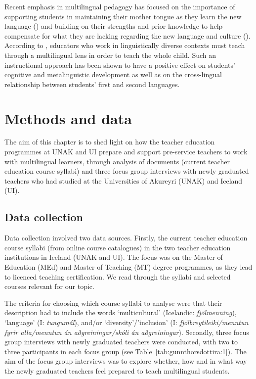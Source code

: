 \documentclass[output=paper]{langscibook}
\begin{document}
Recent emphasis in multilingual pedagogy has focused on the importance of supporting students in maintaining their mother tongue as they learn the new language (\citealt{BaileyMarsden2017}) and building on their strengths and prior knowledge to help compensate for what they are lacking regarding the new language and culture (\citealt{Cummins2014}). According to \citet{Cummins2017}, educators who work in linguistically diverse contexts must teach through a multilingual lens in order to teach the whole child. Such an instructional approach has been shown to have a positive effect on students’ cognitive and metalinguistic development as well as on the cross-lingual relationship between students’ first and second languages.

\section{Methods and data} %

The aim of this chapter is to shed light on how the teacher education programmes at UNAK and UI prepare and support pre-service teachers to work with multilingual learners, through analysis of documents (current teacher education course syllabi) and three focus group interviews with newly graduated teachers who had studied at the Universities of Akureyri (UNAK) and Iceland (UI). 

\subsection{Data collection}

Data collection involved two data sources. Firstly, the current teacher education course syllabi (from online course catalogues) in the two  teacher education institutions in Iceland (UNAK and UI). The focus was on the Master of Education (MEd) and Master of Teaching (MT) degree programmes, as they lead to licenced teaching certification. We read through the syllabi and selected courses relevant for our topic.

The criteria for choosing which course syllabi to analyse were that their description had to include the words ‘multicultural’ (Icelandic: \textit{fjölmenning}), ‘language’ (I: \textit{tungumál}), and/or ‘diversity’/’inclusion’ (I: \textit{fjölbreytileiki\slash menntun fyrir alla\slash menntun án aðgreiningar\slash skóli án aðgreiningar}). Secondly, three focus group interviews with newly graduated teachers were conducted, with two to three participants in each focus group (see Table~\ref{tab:gunnthorsdottira:1}). The aim of the focus group interviews was to explore whether, how and in what way the newly graduated teachers feel prepared to teach multilingual students.
\end{document}

